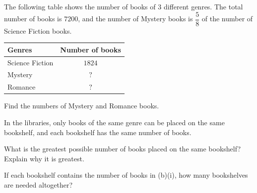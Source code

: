  The following table shows the number of books of $3$ different genres. The total number of books is $7200$, and the number of Mystery books is $\dfrac{5}{8}$ of the number of Science Fiction books.

\begin{center}
\begin{tabular}{|l|c|}
\hline
\textbf{Genres} & \textbf{Number of books} \\
\hline
Science Fiction & $1824$ \\
Mystery         & $?$ \\
Romance         & $?$ \\
\hline
\end{tabular}
\end{center}

\begin{subparts}
  \item Find the numbers of Mystery and Romance books.
  \item In the libraries, only books of the same genre can be placed on the same bookshelf, and each bookshelf has the same number of books.
  \begin{subpartsii}
    \item What is the greatest possible number of books placed on the same bookshelf? Explain why it is greatest.
    \item If each bookshelf contains the number of books in (b)(i), how many bookshelves are needed altogether?
  \end{subpartsii}
\end{subparts}

